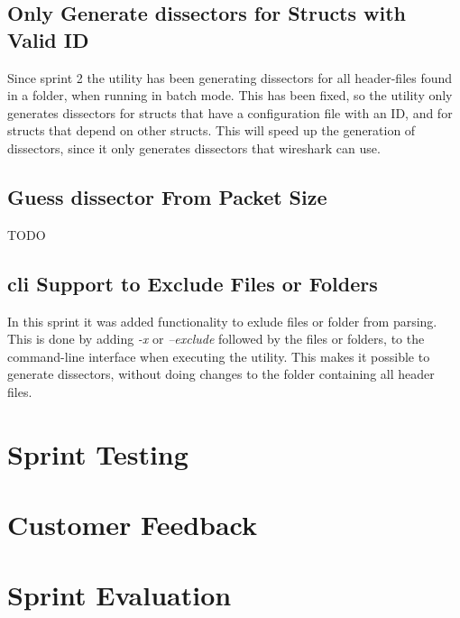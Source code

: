 \subsection{Only Generate \glspl{dissector} for Structs with Valid ID}
Since sprint 2 the \gls{utility} has been generating \glspl{dissector} for all \gls{header}-files 
found in a folder, when running in \gls{batch mode}. This has been fixed, so the \gls{utility} 
only generates \glspl{dissector} for \glspl{struct} that have a configuration file with an 
ID, and for \glspl{struct} that depend on other \glspl{struct}. This will speed up the 
generation of \glspl{dissector}, since it only generates \glspl{dissector} that \Gls{wireshark} 
can use.

\subsection{Guess \gls{dissector} From Packet Size}
TODO

\subsection{\gls{cli} Support to Exclude Files or Folders}
In this sprint it was added functionality to exlude files or folder from 
parsing. This is done by adding \emph{-x} or \emph{--exclude} followed by the 
files or folders, to the command-line interface when executing the utility. 
This makes it possible to generate dissectors, without doing changes to the 
folder containing all header files.


\section{Sprint Testing}
\label{sec:sp4test}


\section{Customer Feedback}
\label{sec:sp4feedback}


\section{Sprint Evaluation}
\label{sec:sp4eval}



